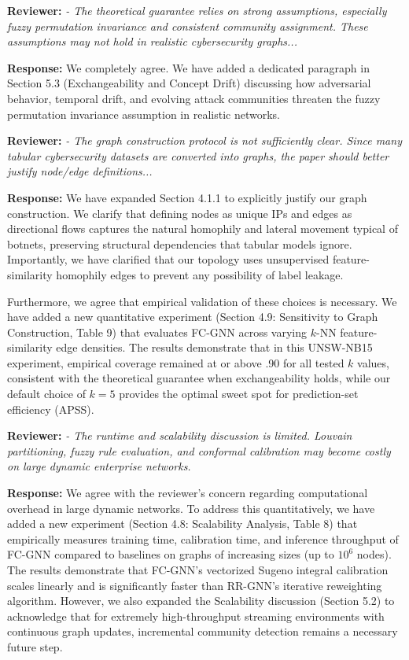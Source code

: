 \documentclass[11pt]{article}
\newcommand{\reviewer}[1]{\vspace{1em}\noindent\textbf{Reviewer: }\textit{#1}\vspace{0.5em}}
\newcommand{\response}[1]{\noindent\textbf{Response: }#1}
\begin{document}
\reviewer{- The theoretical guarantee relies on strong assumptions, especially fuzzy permutation invariance and consistent community assignment. These assumptions may not hold in realistic cybersecurity graphs...}

\response{We completely agree. We have added a dedicated paragraph in Section 5.3 (Exchangeability and Concept Drift) discussing how adversarial behavior, temporal drift, and evolving attack communities threaten the fuzzy permutation invariance assumption in realistic networks.}

\reviewer{- The graph construction protocol is not sufficiently clear. Since many tabular cybersecurity datasets are converted into graphs, the paper should better justify node/edge definitions...}

\response{We have expanded Section 4.1.1 to explicitly justify our graph construction. We clarify that defining nodes as unique IPs and edges as directional flows captures the natural homophily and lateral movement typical of botnets, preserving structural dependencies that tabular models ignore. Importantly, we have clarified that our topology uses unsupervised feature-similarity homophily edges to prevent any possibility of label leakage. 

Furthermore, we agree that empirical validation of these choices is necessary. We have added a new quantitative experiment (Section 4.9: Sensitivity to Graph Construction, Table 9) that evaluates FC-GNN across varying $k$-NN feature-similarity edge densities. The results demonstrate that in this UNSW-NB15 experiment, empirical coverage remained at or above .90 for all tested $k$ values, consistent with the theoretical guarantee when exchangeability holds, while our default choice of $k=5$ provides the optimal sweet spot for prediction-set efficiency (APSS).}

\reviewer{- The runtime and scalability discussion is limited. Louvain partitioning, fuzzy rule evaluation, and conformal calibration may become costly on large dynamic enterprise networks.}

\response{We agree with the reviewer's concern regarding computational overhead in large dynamic networks. To address this quantitatively, we have added a new experiment (Section 4.8: Scalability Analysis, Table 8) that empirically measures training time, calibration time, and inference throughput of FC-GNN compared to baselines on graphs of increasing sizes (up to $10^6$ nodes). The results demonstrate that FC-GNN's vectorized Sugeno integral calibration scales linearly and is significantly faster than RR-GNN's iterative reweighting algorithm. However, we also expanded the Scalability discussion (Section 5.2) to acknowledge that for extremely high-throughput streaming environments with continuous graph updates, incremental community detection remains a necessary future step.}
\end{document}
